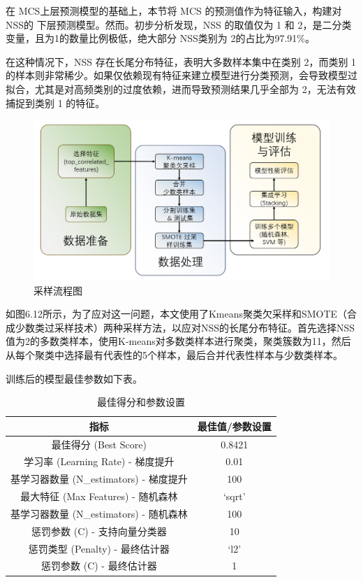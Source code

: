 在 MCS上层预测模型的基础上，本节将 MCS 的预测值作为特征输入，构建对 NSS的 下层预测模型。然而。初步分析发现，NSS 的取值仅为 1 和 2，是二分类变量，且为1的数量比例极低，绝大部分 NSS类别为 2的占比为97.91\%。


在这种情况下，NSS 存在长尾分布特征，表明大多数样本集中在类别 2，而类别 1 的样本则非常稀少。如果仅依赖现有特征来建立模型进行分类预测，会导致模型过拟合，尤其是对高频类别的过度依赖，进而导致预测结果几乎全部为 2，无法有效捕捉到类别 1 的特征。


\begin{figure}[H]
	\centering
	\includegraphics[width=0.7\linewidth]{figures/问题2采样流程}
	\caption{采样流程图}
	\label{fig:2}
\end{figure}

如图6.12所示，为了应对这一问题，本文使用了Kmeans聚类欠采样和SMOTE（合成少数类过采样技术）两种采样方法，以应对NSS的长尾分布特征。首先选择NSS值为2的多数类样本，使用K-means对多数类样本进行聚类，聚类簇数为11，然后从每个聚类中选择最有代表性的5个样本，最后合并代表性样本与少数类样本。

训练后的模型最佳参数如下表。

\begin{table}[H]
	\centering
	\caption{最佳得分和参数设置}
	\begin{tabular}{cc}
		\toprule
		指标 & 最佳值/参数设置 \\
		\midrule
		最佳得分 (Best Score) & 0.8421 \\
		学习率 (Learning Rate) - 梯度提升 & 0.01 \\
		基学习器数量 (N\_estimators) - 梯度提升 & 100 \\
		最大特征 (Max Features) - 随机森林 & `sqrt' \\
		基学习器数量 (N\_estimators) - 随机森林 & 100 \\
		惩罚参数 (C) - 支持向量分类器 & 10 \\
		惩罚类型 (Penalty) - 最终估计器 & `l2' \\
		惩罚参数 (C) - 最终估计器 & 1 \\
		\bottomrule
	\end{tabular}
\end{table}


